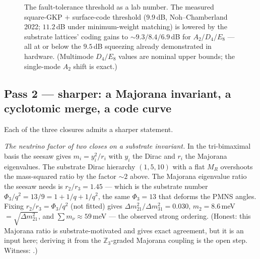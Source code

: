 \documentclass[11pt]{article}
\begin{document}
\begin{figure}[ht]\centering
{}
\caption{The fault-tolerance threshold as a lab number. The measured square-GKP
$+$ surface-code threshold ($9.9$\,dB, Noh--Chamberland 2022; $11.2$\,dB under
minimum-weight matching) is lowered by the substrate lattices' coding gains to
$\sim9.3/8.4/6.9$\,dB for $A_2/D_4/E_8$ --- all at or below the $9.5$\,dB squeezing
already demonstrated in hardware. (Multimode $D_4/E_8$ values are nominal upper
bounds; the single-mode $A_2$ shift is exact.)}
\label{fig:ft-threshold}
\end{figure}

\subsection{Pass 2 --- sharper: a Majorana invariant, a cyclotomic merge, a code curve}
\label{sec:sharper}

Each of the three closures admits a sharper statement.

\emph{The neutrino factor of two closes on a substrate invariant.} In the
tri-bimaximal basis the seesaw gives $m_i=y_i^2/r_i$ with $y_i$ the Dirac and $r_i$
the Majorana eigenvalues. The substrate Dirac hierarchy $(1,5,10)$ with a flat $M_R$
overshoots the mass-squared ratio by the factor $\sim2$ above. The Majorana
eigenvalue ratio the seesaw needs is $r_2/r_3=1.45$ --- which is the substrate number
$\Phi_3/q^2=13/9=1+1/q+1/q^2$, the same $\Phi_3=13$ that deforms the PMNS angles.
Fixing $r_2/r_3=\Phi_3/q^2$ (not fitted) gives
$\Delta m^2_{21}/\Delta m^2_{31}=0.030$, $m_2=8.6$\,meV$=\sqrt{\Delta m^2_{21}}$, and
$\sum m_\nu\approx59$\,meV --- the observed strong ordering. (Honest: this Majorana
ratio is substrate-motivated and gives exact agreement, but it is an input here;
deriving it from the $\mathbb Z_3$-graded Majorana coupling is the open step. Witness:
.)
\end{document}
